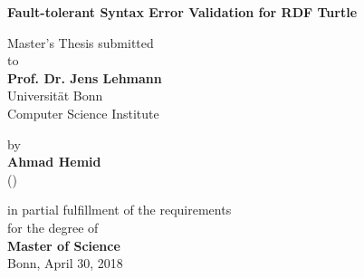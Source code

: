 \begin{center}

    {\Large{\bf Fault-tolerant Syntax Error Validation for RDF Turtle  }} \vspace{0.5cm}


    {\normalsize Master's Thesis submitted\\\vspace{0.5cm}
    to}\\\vspace{0.5cm}
    {\normalsize{\bf Prof. Dr. Jens  Lehmann}} \\\vspace{0.5cm}
    {\normalsize Universit\"at  Bonn \\
    Computer Science Institute  \\} \vspace{1cm}


    {\normalsize by \\\vspace{0.5cm}
    {\bf Ahmad Hemid} \\
    ()} \vspace{1cm}


    {\normalsize in partial fulfillment of the requirements \\
    for the degree of \\
    {\bf Master of Science} \\
    Bonn, April 30, 2018}

\end{center}
